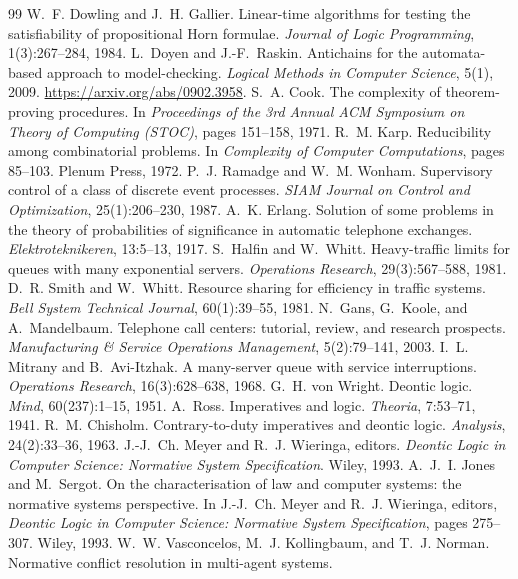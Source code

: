 \documentclass[11pt,a4paper]{article}
\begin{document}
\begin{thebibliography}{99}
 W.~F. Dowling and J.~H. Gallier. Linear-time algorithms for testing the satisfiability of propositional Horn
formulae. \emph{Journal of Logic Programming}, 1(3):267--284, 1984.
 L.~Doyen and J.-F.~Raskin. Antichains for the automata-based approach to model-checking.
\emph{Logical Methods in Computer Science}, 5(1), 2009. \url{https://arxiv.org/abs/0902.3958}.
 S.~A. Cook. The complexity of theorem-proving procedures. In \emph{Proceedings of the 3rd Annual ACM Symposium
on Theory of Computing (STOC)}, pages 151--158, 1971.
 R.~M. Karp. Reducibility among combinatorial problems. In \emph{Complexity of Computer Computations}, pages
85--103. Plenum Press, 1972.
 P.~J. Ramadge and W.~M. Wonham. Supervisory control of a class of discrete event processes. \emph{SIAM Journal
on Control and Optimization}, 25(1):206--230, 1987.
 A.~K. Erlang. Solution of some problems in the theory of probabilities of significance in automatic
telephone exchanges. \emph{Elektroteknikeren}, 13:5--13, 1917.
 S.~Halfin and W.~Whitt. Heavy-traffic limits for queues with many exponential servers. \emph{Operations
Research}, 29(3):567--588, 1981.
 D.~R. Smith and W.~Whitt. Resource sharing for efficiency in traffic systems. \emph{Bell System Technical
Journal}, 60(1):39--55, 1981.
 N.~Gans, G.~Koole, and A.~Mandelbaum. Telephone call centers: tutorial, review, and research prospects.
\emph{Manufacturing \& Service Operations Management}, 5(2):79--141, 2003.
 I.~L. Mitrany and B.~Avi-Itzhak. A many-server queue with service interruptions. \emph{Operations Research},
16(3):628--638, 1968.
 G.~H. von Wright. Deontic logic. \emph{Mind}, 60(237):1--15, 1951.
 A.~Ross. Imperatives and logic. \emph{Theoria}, 7:53--71, 1941.
 R.~M. Chisholm. Contrary-to-duty imperatives and deontic logic. \emph{Analysis}, 24(2):33--36, 1963.
 J.-J.~Ch. Meyer and R.~J. Wieringa, editors. \emph{Deontic Logic in Computer Science: Normative System
Specification}. Wiley, 1993.
 A.~J.~I. Jones and M.~Sergot. On the characterisation of law and computer systems: the normative systems
perspective. In J.-J.~Ch. Meyer and R.~J. Wieringa, editors, \emph{Deontic Logic in Computer Science: Normative System
Specification}, pages 275--307. Wiley, 1993.
 W.~W. Vasconcelos, M.~J. Kollingbaum, and T.~J. Norman. Normative conflict resolution in multi-agent systems.

\end{thebibliography}
\end{document}
